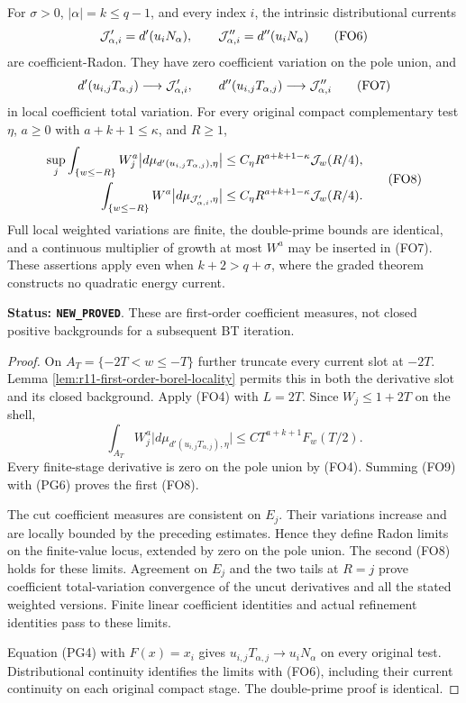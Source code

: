 \begin{theorem}
\label{thm:r11-unbounded-first-order}
For $\sigma>0$, $|\alpha|=k\leq q-1$, and every index $i$,
the intrinsic distributional currents
\[
 {\cal J}'_{\alpha,i}=d'(u_iN_\alpha),\qquad
 {\cal J}''_{\alpha,i}=d''(u_iN_\alpha)
 \tag{FO6}
\]
are coefficient-Radon. They have zero coefficient variation
on the pole union, and
\[
 d'(u_{i,j}T_{\alpha,j})\longrightarrow{\cal J}'_{\alpha,i},
 \qquad
 d''(u_{i,j}T_{\alpha,j})\longrightarrow{\cal J}''_{\alpha,i}
 \tag{FO7}
\]
in local coefficient total variation.
For every original compact complementary test $\eta$,
$a\geq0$ with $a+k+1\leq\kappa$, and $R\geq1$,
\[
 \begin{split}
 \sup_j\int_{\{w\leq-R\}}W_j^a
       \bigl|d\mu_{d'(u_{i,j}T_{\alpha,j}),\eta}\bigr|
     &\leq C_\eta R^{a+k+1-\kappa}{\cal J}_w(R/4),\\
 \int_{\{w\leq-R\}}W^a
       \bigl|d\mu_{{\cal J}'_{\alpha,i},\eta}\bigr|
     &\leq C_\eta R^{a+k+1-\kappa}{\cal J}_w(R/4).
 \end{split}
 \tag{FO8}
\]
Full local weighted variations are finite, the double-prime
bounds are identical, and a continuous multiplier of growth
at most $W^a$ may be inserted in (FO7).
These assertions apply even when $k+2>q+\sigma$, where
the graded theorem constructs no quadratic energy current.
\end{theorem}

\noindent\textbf{Status: \texttt{NEW\_PROVED}}.
These are first-order coefficient measures, not closed
positive backgrounds for a subsequent BT iteration.

\begin{proof}
On $A_T=\{-2T<w\leq-T\}$ further truncate every current
slot at $-2T$. Lemma
\ref{lem:r11-first-order-borel-locality} permits this in
both the derivative slot and its closed background.
Apply (FO4) with $L=2T$. Since $W_j\leq1+2T$ on the shell,
\[
 \int_{A_T}W_j^a
       \bigl|d\mu_{d'(u_{i,j}T_{\alpha,j}),\eta}\bigr|
                    \leq C T^{a+k+1}F_w(T/2).
 \tag{FO9}
\]
Every finite-stage derivative is zero on the pole union
by (FO4). Summing (FO9) with (PG6) proves the first (FO8).

The cut coefficient measures are consistent on $E_j$.
Their variations increase and are locally bounded by
the preceding estimates. Hence they define Radon limits
on the finite-value locus, extended by zero on the
pole union. The second (FO8) holds for these limits.
Agreement on $E_j$ and the two tails at $R=j$ prove
coefficient total-variation convergence of the uncut
derivatives and all the stated weighted versions.
Finite linear coefficient identities and actual
refinement identities pass to these limits.

Equation (PG4) with $F(x)=x_i$ gives
$u_{i,j}T_{\alpha,j}\to u_iN_\alpha$ on every original
test. Distributional continuity identifies the limits
with (FO6), including their current continuity on
each original compact stage. The double-prime proof
is identical.
\end{proof}


